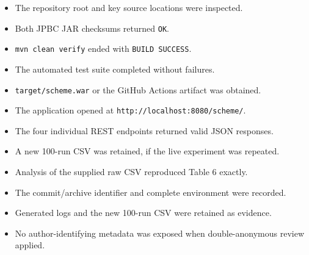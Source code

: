 \documentclass[11pt,a4paper]{article}
\begin{document}
\begin{itemize}[label=$\Box$]
  \item The repository root and key source locations were inspected.
  \item Both JPBC JAR checksums returned \texttt{OK}.
  \item \texttt{mvn clean verify} ended with \texttt{BUILD SUCCESS}.
  \item The automated test suite completed without failures.
  \item \texttt{target/scheme.war} or the GitHub Actions artifact was obtained.
  \item The application opened at \texttt{http://localhost:8080/scheme/}.
  \item The four individual REST endpoints returned valid JSON responses.
  \item A new 100-run CSV was retained, if the live experiment was repeated.
  \item Analysis of the supplied raw CSV reproduced Table 6 exactly.
  \item The commit/archive identifier and complete environment were recorded.
  \item Generated logs and the new 100-run CSV were retained as evidence.
  \item No author-identifying metadata was exposed when double-anonymous review applied.
\end{itemize}
\end{document}
